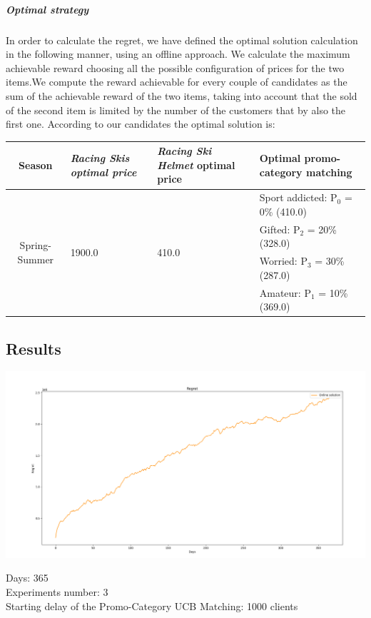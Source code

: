 \subparagraph{Optimal strategy}
In order to calculate the regret, we have defined the optimal solution calculation in the following manner, using an offline approach. We calculate the maximum achievable reward choosing all the possible configuration of prices for the two items.We compute the reward achievable for every couple of candidates as the sum of the achievable reward of the two items, taking into account that the sold of the second item is limited by the number of the customers that by also the first one. 
According to our candidates the optimal solution is:
\begin{center}
	\begin{tabular}{|c|p{4cm}|p{4cm}|p{4cm}|} 
	\hline
	Season & \textit{Racing Skis optimal price} & \textit{Racing Ski Helmet} optimal price & Optimal promo-category matching \\ \hline
	\multirow{4}{*}{Spring-Summer} & \multirow{4}{*}{1900.0} & \multirow{4}{*}{410.0} & Sport addicted: P$_0$ = 0\% (410.0)  \\ 
								   & 					   &                      & Gifted: P$_2$ = 20\% (328.0)          \\ 
								   & 					   &                      & Worried: P$_3$ = 30\% (287.0)         \\
								   & 					   &                      & Amateur: P$_1$ = 10\% (369.0)         \\ \hline
	\end{tabular}
\end{center}

\subsection*{Results}
\begin{center}
	\includegraphics[scale=0.35]{Images/n6}
\end{center}
Days: 365\\
Experiments number: 3 \\
Starting delay of the Promo-Category UCB Matching: 1000 clients\\

